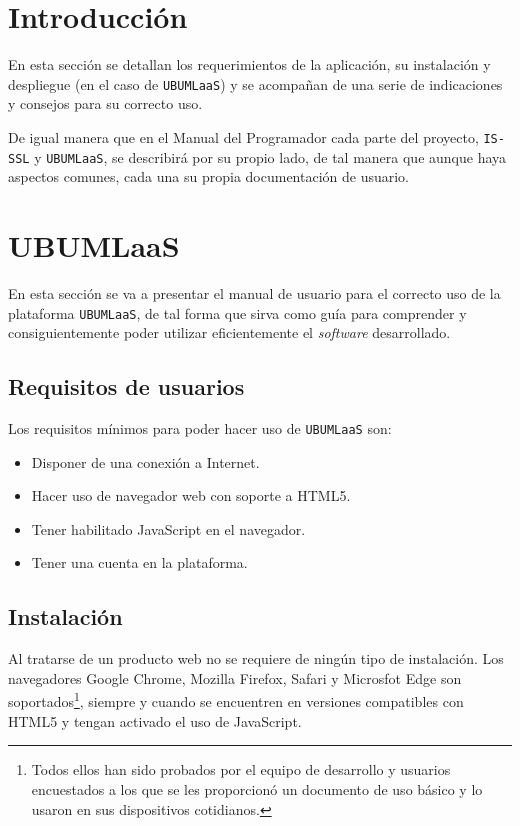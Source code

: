 
\section{Introducción}
En esta sección se detallan los requerimientos de la aplicación, su instalación y despliegue (en el caso de \texttt{UBUMLaaS}) y se acompañan de una serie de indicaciones y consejos para su correcto uso.

De igual manera que en el Manual del Programador cada parte del proyecto, \texttt{IS-SSL} y \texttt{UBUMLaaS}, se describirá por su propio lado, de tal manera que aunque haya aspectos comunes, cada una su propia documentación de usuario.

\section{UBUMLaaS}
En esta sección se va a presentar el manual de usuario para el correcto uso de la plataforma \texttt{UBUMLaaS}, de tal forma que sirva como guía para comprender y consiguientemente poder utilizar eficientemente el \textit{software} desarrollado.
\subsection{Requisitos de usuarios}
Los requisitos mínimos para poder hacer uso de \texttt{UBUMLaaS} son:
\begin{itemize}
\item Disponer de una conexión a Internet.
\item Hacer uso de navegador web con soporte a HTML5.
\item Tener habilitado JavaScript en el navegador.
\item Tener una cuenta en la plataforma.
\end{itemize}
\subsection{Instalación}
Al tratarse de un producto web no se requiere de ningún tipo de instalación. Los navegadores Google Chrome, Mozilla Firefox, Safari y Microsfot Edge son soportados\footnote{Todos ellos han sido probados por el equipo de desarrollo y usuarios encuestados a  los que se les proporcionó un documento de uso básico y lo usaron en sus dispositivos cotidianos.}, siempre y cuando se encuentren en versiones compatibles con HTML5 y tengan activado el uso de JavaScript.

